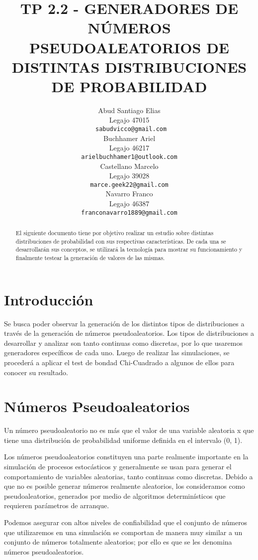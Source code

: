 \documentclass{article}
\title{TP 2.2 - GENERADORES DE NÚMEROS PSEUDOALEATORIOS DE DISTINTAS DISTRIBUCIONES DE PROBABILIDAD}
\author{
    Abud Santiago Elias \\
    Legajo 47015 \\
    \texttt{ sabudvicco@gmail.com} \\
    \And
    Buchhamer Ariel \\
    Legajo 46217\\
    \texttt{arielbuchhamer1@outlook.com} \\
    \And
    Castellano Marcelo \\
    Legajo 39028 \\
    \texttt{marce.geek22@gmail.com} \\
    \And
    Navarro Franco \\
    Legajo 46387 \\
    \texttt{franconavarro1889@gmail.com} \\
}
\begin{document}
  \maketitle
  \begin{abstract}
    El siguiente documento tiene por objetivo realizar un estudio sobre distintas distribuciones de probabilidad con sus respectivas características. De cada una se desarrollarán sus conceptos, se utilizará la tecnología para mostrar su funcionamiento y finalmente testear la generación de valores de las mismas.\end{abstract}





  \section{Introducción}
  \label{sec:introducción}
  Se busca poder observar la generación de los distintos tipos de distribuciones a través de la generación
    de números pseudoaleatorios. Los tipos de distribuciones a desarrollar y analizar son tanto continuas como discretas, por lo que usaremos generadores específicos de cada uno.
    Luego de realizar las simulaciones, se procederá a aplicar el test de bondad Chi-Cuadrado a algunos de ellos para conocer su resultado.


  \section{Números Pseudoaleatorios}
  \label{sec:headings}
  Un número pseudoaleatorio no es más que el valor de una variable aleatoria x que tiene una distribución de probabilidad uniforme definida en el intervalo (0, 1).

  Los números pseudoaleatorios constituyen una parte realmente importante en la simulación de procesos estocásticos y generalmente se usan para generar el comportamiento de variables aleatorias, tanto continuas como discretas. Debido a que no es posible generar números realmente aleatorios, los consideramos como pseudoaleatorios, generados por medio de algoritmos determinísticos que requieren parámetros de arranque.

  Podemos asegurar con altos niveles de confiabilidad que el conjunto de números que utilizaremos en una simulación se comportan de manera muy similar a un conjunto de números totalmente aleatorios; por ello es que se les denomina números pseudoaleatorios.
\end{document}
